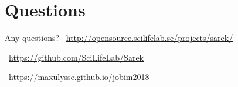 \documentclass[usepdftitle=false]{beamer}
\begin{document}
{
	\section{Questions}
	\begin{frame}[plain]{Any questions?}
	\vspace{-6cm}
	\faGlobe\ \url{http://opensource.scilifelab.se/projects/sarek/}

	\faGithub\ \url{https://github.com/SciLifeLab/Sarek}

	\faGlobe\ \url{https://maxulysse.github.io/jobim2018}
	\end{frame}
}

\end{document}
